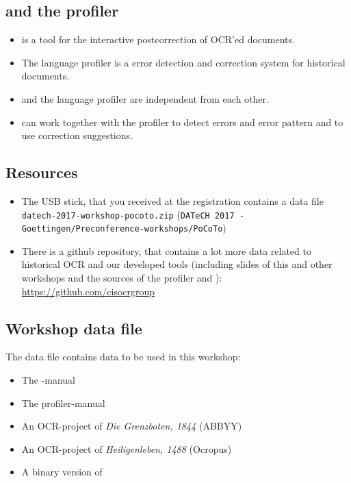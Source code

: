 \subsection{\pocoto{} and the profiler}
\begin{frame}
	\begin{itemize}
		\item \pocoto{} is a tool for the interactive postcorrection of OCR'ed
			documents.
		\item The language profiler is a error detection and correction system for
			historical documents.
		\item \pocoto{} and the language profiler are independent from each other.
		\item \pocoto{} can work together with the profiler to detect errors and
			error pattern and to use correction suggestions.
	\end{itemize}
\end{frame}

\subsection{Resources}
\begin{frame}
	\begin{itemize}
		\item The USB stick, that you received at the registration contains a data
			file \texttt{datech-2017-workshop-pocoto.zip} (\texttt{DATeCH 2017 -
			Goettingen/Preconference-workshops/PoCoTo})
		\item There is a github repository, that contains a lot more data related to
			historical OCR and our developed tools (including slides of this and other
			workshops and the sources of the profiler and \pocoto{}):
			\href{https://github.com/cisocrgroup}{\url{https://github.com/cisocrgroup}}
	\end{itemize}
\end{frame}

\subsection{Workshop data file}
\begin{frame}
	The data file contains data to be used in this workshop:
	\begin{itemize}
		\item The \pocoto{}-manual
		\item The profiler-manual
		\item An OCR-project of \emph{Die Grenzboten, 1844} (ABBYY)
		\item An OCR-project of \emph{Heiligenleben, 1488} (Ocropus)
		\item A binary version of \pocoto{}
	\end{itemize}
\end{frame}

\section{}
\subsection{}
\begin{frame}
\end{frame}


